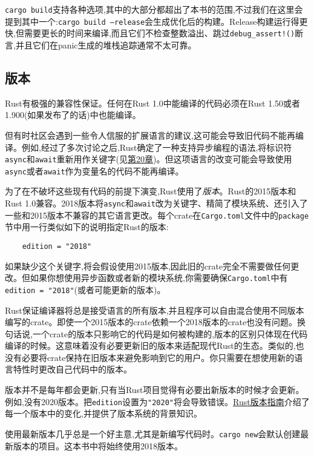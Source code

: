 \texttt{cargo build}支持各种选项,其中的大部分都超出了本书的范围,不过我们在这里会提到其中一个:\texttt{cargo build --release}会生成优化后的构建。Release构建运行得更快,但需要更长的时间来编译,而且它们不检查整数溢出、跳过\texttt{debug\_assert!()}断言,并且它们在panic生成的堆栈追踪通常不太可靠。

\subsection{版本}

Rust有极强的兼容性保证。任何在Rust 1.0中能编译的代码必须在Rust 1.50或者1.900(如果发布了的话)中也能编译。


但有时社区会遇到一些令人信服的扩展语言的建议,这可能会导致旧代码不能再编译。例如,经过了多次讨论之后,Rust确定了一种支持异步编程的语法,将标识符\texttt{async}和\texttt{await}重新用作关键字(见\hyperref[ch20]{第20章})。但这项语言的改变可能会导致使用\texttt{async}或者\texttt{await}作为变量名的代码不能再编译。

为了在不破坏这些现有代码的前提下演变,Rust使用了\emph{版本}。Rust的2015版本和Rust 1.0兼容。2018版本将\texttt{async}和\texttt{await}改为关键字、精简了模块系统、还引入了一些和2015版本不兼容的其它语言更改。每个crate在\texttt{Cargo.toml}文件中的\texttt{package}节中用一行类似如下的说明指定Rust的版本:
\begin{verbatim}
    edition = "2018"
\end{verbatim}

如果缺少这个关键字,将会假设使用2015版本,因此旧的crate完全不需要做任何更改。但如果你想使用异步函数或者新的模块系统,你需要确保\texttt{Cargo.toml}中有\texttt{edition = "2018"}(或者可能更新的版本)。

Rust保证编译器将总是接受语言的所有版本,并且程序可以自由混合使用不同版本编写的crate。即使一个2015版本的crate依赖一个2018版本的crate也没有问题。换句话说,一个crate的版本只影响它的代码是如何被构建的,版本的区别只体现在代码编译的时候。这意味着没有必要更新旧的版本来适配现代Rust的生态。类似的,也没有必要将crate保持在旧版本来避免影响到它的用户。你只需要在想使用新的语言特性时更改自己代码中的版本。

版本并不是每年都会更新,只有当Rust项目觉得有必要出新版本的时候才会更新。例如,没有2020版本。把\texttt{edition}设置为\texttt{"2020"}将会导致错误。\href{https://doc.rust-lang.org/stable/edition-guide}{Rust版本指南}介绍了每一个版本中的变化,并提供了版本系统的背景知识。

使用最新版本几乎总是一个好主意,尤其是新编写代码时。\texttt{cargo new}会默认创建最新版本的项目。这本书中将始终使用2018版本。

